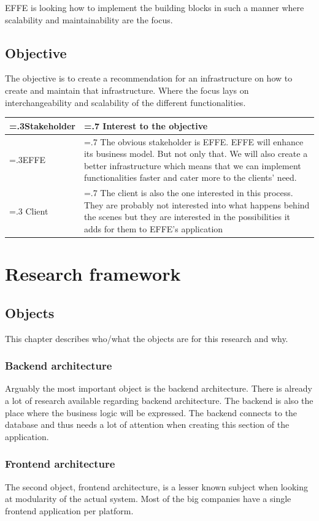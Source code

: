 \documentclass{report}
\begin{document}
EFFE is looking how to implement the building blocks in such a manner where scalability and maintainability are the focus.

\subsection{Objective}
The objective is to create a recommendation for an infrastructure on how to create and maintain that infrastructure. Where the focus lays on interchangeability and scalability of the different functionalities.

\begin{tabularx}{\linewidth}{|>{\hsize=.3\hsize}X|
		>{\hsize=.7\hsize}X|}
	\hline
	Stakeholder &
	Interest to the objective
	\\
	\hline
	EFFE &
	The obvious stakeholder is EFFE. EFFE will enhance its business model. But not only that. We will also create a better infrastructure which means that we can implement functionalities faster and cater more to the clients’ need.
	\\
	\hline
	Client &
	The client is also the one interested in this process. They are probably not interested into what happens behind the scenes but they are interested in the possibilities it adds for them to EFFE’s application
	\\
	\hline
\end{tabularx}

\section{Research framework}

\subsection{Objects}
This chapter describes who/what the objects are for this research and why.

\subsubsection{Backend architecture}
Arguably the most important object is the backend architecture. There is already a lot of research available regarding backend architecture. The backend is also the place where the business logic will be expressed. The backend connects to the database and thus needs a lot of attention when creating this section of the application.

\subsubsection{Frontend architecture}
The second object, frontend architecture, is a lesser known subject when looking at modularity of the actual system. Most of the big companies have a single frontend application per platform.
\end{document}
